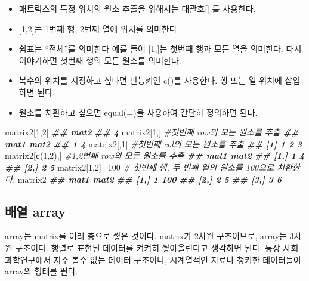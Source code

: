 \documentclass[
]{book}
\newenvironment{Shaded}{\begin{snugshade}}{\end{snugshade}}
\newcommand{\CommentTok}[1]{\textcolor[rgb]{0.56,0.35,0.01}{\textit{#1}}}
\newcommand{\DecValTok}[1]{\textcolor[rgb]{0.00,0.00,0.81}{#1}}
\newcommand{\DocumentationTok}[1]{\textcolor[rgb]{0.56,0.35,0.01}{\textbf{\textit{#1}}}}
\newcommand{\FunctionTok}[1]{\textcolor[rgb]{0.13,0.29,0.53}{\textbf{#1}}}
\newcommand{\NormalTok}[1]{#1}
\newcommand{\OtherTok}[1]{\textcolor[rgb]{0.56,0.35,0.01}{#1}}
\providecommand{\tightlist}{%
  \setlength{\itemsep}{0pt}\setlength{\parskip}{0pt}}
\begin{document}
\begin{itemize}
\tightlist
\item
  매트릭스의 특정 위치의 원소 추출을 위해서는 대괄호{[}{]} 를 사용한다.
\item
  {[}1,2{]}는 1번째 행, 2번째 열에 위치를 의미한다
\item
  쉼표는 ``전체''를 의미한다 예를 들어 {[}1,{]}는 첫번째 행과 모든 열을 의미한다. 다시 이야기하면 첫번째 행의 모든 원소를 의미한다.
\item
  복수의 위치를 지정하고 싶다면 만능키인 c()를 사용한다. 행 또는 열 위치에 삽입하면 된다.
\item
  원소를 치환하고 싶으면 equal(=)을 사용하여 간단히 정의하면 된다.
\end{itemize}

\begin{Shaded}
\begin{Highlighting}[]
\NormalTok{matrix2[}\DecValTok{1}\NormalTok{,}\DecValTok{2}\NormalTok{]}
\DocumentationTok{\#\# mat2 }
\DocumentationTok{\#\#    4}
\NormalTok{matrix2[}\DecValTok{1}\NormalTok{,] }\CommentTok{\#첫번째 row의 모든 원소를 추출}
\DocumentationTok{\#\# mat1 mat2 }
\DocumentationTok{\#\#    1    4}
\NormalTok{matrix2[,}\DecValTok{1}\NormalTok{] }\CommentTok{\#첫번째 col의 모든 원소를 추출}
\DocumentationTok{\#\# [1] 1 2 3}
\NormalTok{matrix2[}\FunctionTok{c}\NormalTok{(}\DecValTok{1}\NormalTok{,}\DecValTok{2}\NormalTok{),] }\CommentTok{\#1,2번째 row의 모든 원소를 추출}
\DocumentationTok{\#\#      mat1 mat2}
\DocumentationTok{\#\# [1,]    1    4}
\DocumentationTok{\#\# [2,]    2    5}
\NormalTok{matrix2[}\DecValTok{1}\NormalTok{,}\DecValTok{2}\NormalTok{]}\OtherTok{=}\DecValTok{100} \CommentTok{\# 첫번째 행, 두 번째 열의 원소를 100으로 치환한다. }
\NormalTok{matrix2}
\DocumentationTok{\#\#      mat1 mat2}
\DocumentationTok{\#\# [1,]    1  100}
\DocumentationTok{\#\# [2,]    2    5}
\DocumentationTok{\#\# [3,]    3    6}
\end{Highlighting}
\end{Shaded}

\subsection{배열 array}\label{uxbc30uxc5f4-array}

array는 matrix를 여러 층으로 쌓은 것이다. matrix가 2차원 구조이므로, array는 3차원 구조이다. 행렬로 표현된 데이터를 켜켜히 쌓아올린다고 생각하면 된다. 통상 사회과학연구에서 자주 볼수 없는 데이터 구조이나, 시계열적인 자료나 청키한 데이터들이 array의 형태를 띈다.
\end{document}
